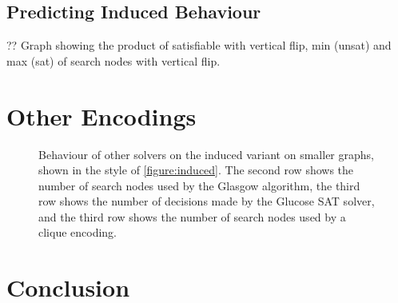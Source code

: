 \documentclass[letterpaper]{article}
\begin{document}
\subsection{Predicting Induced Behaviour}

?? Graph showing the product of satisfiable with vertical flip, min (unsat) and max (sat) of search
nodes with vertical flip.

\section{Other Encodings}

\begin{figure*}
    \hskip-1.2cm
    \setlength{\abovecaptionskip}{-2em}
    \caption{Behaviour of other solvers on the induced variant on smaller graphs, shown in the style of
        \cref{figure:induced}. The second row shows the number of search nodes used by the Glasgow
        algorithm, the third row shows the number of decisions made by the Glucose SAT solver, and
        the third row shows the number of search nodes used by a clique encoding.}
\end{figure*}

\section{Conclusion}



\end{document}
